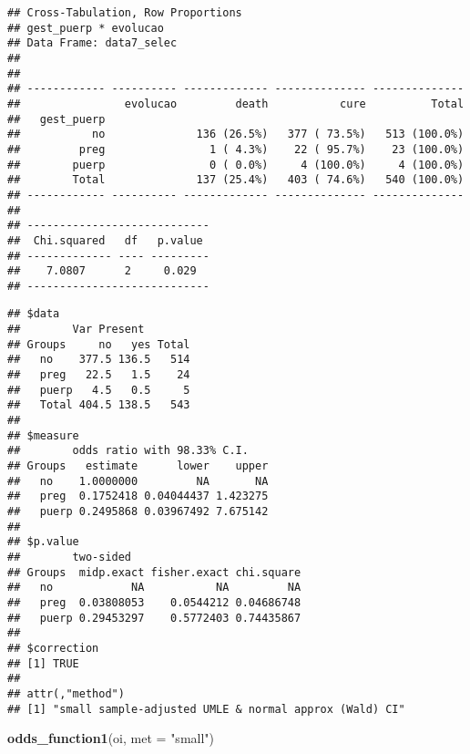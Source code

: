 \documentclass[
]{article}
\newenvironment{Shaded}{\begin{snugshade}}{\end{snugshade}}
\newcommand{\DataTypeTok}[1]{\textcolor[rgb]{0.13,0.29,0.53}{#1}}
\newcommand{\KeywordTok}[1]{\textcolor[rgb]{0.13,0.29,0.53}{\textbf{#1}}}
\newcommand{\NormalTok}[1]{#1}
\newcommand{\OperatorTok}[1]{\textcolor[rgb]{0.81,0.36,0.00}{\textbf{#1}}}
\newcommand{\StringTok}[1]{\textcolor[rgb]{0.31,0.60,0.02}{#1}}
\begin{document}
\begin{verbatim}
## Cross-Tabulation, Row Proportions  
## gest_puerp * evolucao  
## Data Frame: data7_selec  
## 
## 
## ------------ ---------- ------------- -------------- --------------
##                evolucao         death           cure          Total
##   gest_puerp                                                       
##           no              136 (26.5%)   377 ( 73.5%)   513 (100.0%)
##         preg                1 ( 4.3%)    22 ( 95.7%)    23 (100.0%)
##        puerp                0 ( 0.0%)     4 (100.0%)     4 (100.0%)
##        Total              137 (25.4%)   403 ( 74.6%)   540 (100.0%)
## ------------ ---------- ------------- -------------- --------------
## 
## ----------------------------
##  Chi.squared   df   p.value 
## ------------- ---- ---------
##    7.0807      2     0.029  
## ----------------------------
\end{verbatim}

\begin{Shaded}
\end{Shaded}

\begin{verbatim}
## $data
##        Var Present
## Groups     no   yes Total
##   no    377.5 136.5   514
##   preg   22.5   1.5    24
##   puerp   4.5   0.5     5
##   Total 404.5 138.5   543
## 
## $measure
##        odds ratio with 98.33% C.I.
## Groups   estimate      lower    upper
##   no    1.0000000         NA       NA
##   preg  0.1752418 0.04044437 1.423275
##   puerp 0.2495868 0.03967492 7.675142
## 
## $p.value
##        two-sided
## Groups  midp.exact fisher.exact chi.square
##   no            NA           NA         NA
##   preg  0.03808053    0.0544212 0.04686748
##   puerp 0.29453297    0.5772403 0.74435867
## 
## $correction
## [1] TRUE
## 
## attr(,"method")
## [1] "small sample-adjusted UMLE & normal approx (Wald) CI"
\end{verbatim}

\begin{Shaded}
\begin{Highlighting}[]
\KeywordTok{odds_function1}\NormalTok{(oi, }\DataTypeTok{met =} \StringTok{"small"}\NormalTok{)}
\end{Highlighting}
\end{Shaded}
\end{document}
